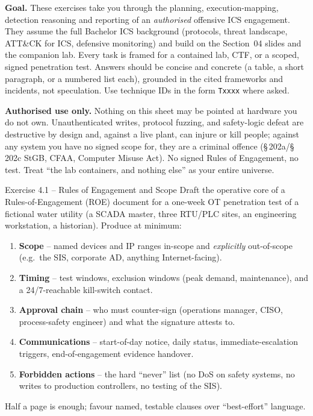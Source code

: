 \documentclass[11pt,a4paper]{article}
\begin{document}
\sheetheader

\noindent
\textbf{Goal.} These exercises take you through the planning, execution-mapping, detection
reasoning and reporting of an \emph{authorised} offensive ICS engagement. They assume the full
Bachelor ICS background (protocols, threat landscape, ATT\&CK for ICS, defensive monitoring) and
build on the Section~04 slides and the companion lab. Every task is framed for a contained lab,
CTF, or a scoped, signed penetration test. Answers should be concise and concrete (a table, a
short paragraph, or a numbered list each), grounded in the cited frameworks and incidents, not
speculation. Use technique IDs in the form \texttt{Txxxx} where asked.

\begin{warnbox}
\textbf{Authorised use only.} Nothing on this sheet may be pointed at hardware you do not own.
Unauthenticated writes, protocol fuzzing, and safety-logic defeat are destructive by design and,
against a live plant, can injure or kill people; against any system you have no signed scope for,
they are a criminal offence (\S\,202a/\S\,202c StGB, CFAA, Computer Misuse Act). No signed Rules
of Engagement, no test. Treat ``the lab containers, and nothing else'' as your entire universe.
\end{warnbox}

\begin{taskbox}{Exercise 4.1 -- Rules of Engagement and Scope}
Draft the operative core of a Rules-of-Engagement (ROE) document for a one-week OT penetration
test of a fictional water utility (a SCADA master, three RTU/PLC sites, an engineering
workstation, a historian). Produce at minimum:
\begin{enumerate}\setlength{\itemsep}{0pt}
  \item \textbf{Scope} -- named devices and IP ranges in-scope and \emph{explicitly} out-of-scope
        (e.g.\ the SIS, corporate AD, anything Internet-facing).
  \item \textbf{Timing} -- test windows, exclusion windows (peak demand, maintenance), and a
        24/7-reachable kill-switch contact.
  \item \textbf{Approval chain} -- who must counter-sign (operations manager, CISO, process-safety
        engineer) and what the signature attests to.
  \item \textbf{Communications} -- start-of-day notice, daily status, immediate-escalation triggers,
        end-of-engagement evidence handover.
  \item \textbf{Forbidden actions} -- the hard ``never'' list (no DoS on safety systems, no writes
        to production controllers, no testing of the SIS).
\end{enumerate}
Half a page is enough; favour named, testable clauses over ``best-effort'' language.
\end{taskbox}
\end{document}
